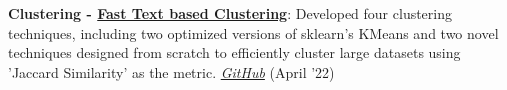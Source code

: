 \documentclass[a4paper,20pt]{article}
\newcommand{\resumeItem}[2]{
  \item\small{
    \textbf{#1}{: #2 \vspace{-2pt}}
  }
}
\newcommand{\resumeSubItem}[2]{\resumeItem{#1}{#2}\vspace{-3pt}}
\begin{document}
\begin{comment}

\resumeSubItem{Computer Vision - \href{https://sampadk04.github.io/post/project-9/}{Fitness Activity Recognition}}{(Internship Project): Used Google's MediaPipe Pose ML solution with BlazePose to analyze fitness demonstration videos for guided instructions to - 1) recognize classify the exercises on a per frame basis; 2) count the no. of repetitions, using Google RepNet; 3) use DTW (Dynamic Time Warping to compare the trainer videos (experts) to the trainee videos (learners) and output a score. \textit{\href{https://www.launchpad.ai/blog/fitness-activity-recognition-using-mediapipe-blazepose}{Blog}} \textit{\href{https://github.com/sampadk04/fitness-activity-recognition/blob/main/Report.pdf}{Report}} \textit{\href{https://github.com/sampadk04/fitness-activity-recognition}{GitHub}} (August '22)}
\vspace{2pt}

\resumeSubItem{ToDo WebApp - \href{https://sampadk04.github.io/post/project-7/}{My ToDo WebApp}}{(Flask WebApp): A social ToDo app to keep track of group tasks. In this shared ToDo WebApp, everyone can view the public ToDo List and Add/Update/Delete the tasks. The Heroku deployed version of this app can be found \href{https://webappmytodo.herokuapp.com/}{here}. \textit{\href{https://github.com/sampadk04/myToDo}{GitHub}} (June '22)}
\vspace{2pt}

\resumeSubItem{Reinforcement Learning - \href{https://sampadk04.github.io/post/project-8/}{Playing Super Mario Bros}}{(OpenAI Gym): A Reinforcement Learning implementation on the OpenAI Gym environment setup for Super Mario Bros using the PPO (Proximal Policy Optimization) Algorithm. \textit{\href{https://github.com/sampadk04/openai-super-mario-bros}{GitHub}} (Aug '22)}
\vspace{2pt}

\end{comment}

\resumeSubItem{Clustering - \href{https://sampadk04.github.io/post/project-1/}{Fast Text based Clustering}}{Developed four clustering techniques, including two optimized versions of sklearn's KMeans and two novel techniques designed from scratch to efficiently cluster large datasets using 'Jaccard Similarity' as the metric. \textit{\href{https://github.com/sampadk04/CMI_Projects/tree/main/DMML_Assignments/Fast_Text_based_Clustering}{GitHub}} (April '22)}
\vspace{2pt}
\end{document}
